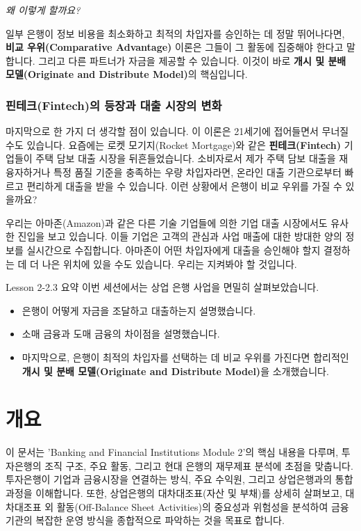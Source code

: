 \documentclass[11pt,a4paper]{article}
\theoremstyle{definition}
\begin{document}
\begin{center}
    \textit{왜 이렇게 할까요?}
\end{center}

일부 은행이 정보 비용을 최소화하고 최적의 차입자를 승인하는 데 정말 뛰어나다면, \textbf{비교 우위(Comparative Advantage)} 이론은 그들이 그 활동에 집중해야 한다고 말합니다. 그리고 다른 파트너가 자금을 제공할 수 있습니다. 이것이 바로 \textbf{개시 및 분배 모델(Originate and Distribute Model)}의 핵심입니다.

\subsubsection*{핀테크(Fintech)의 등장과 대출 시장의 변화}
마지막으로 한 가지 더 생각할 점이 있습니다. 이 이론은 21세기에 접어들면서 무너질 수도 있습니다. 요즘에는 로켓 모기지(Rocket Mortgage)와 같은 \textbf{핀테크(Fintech)} 기업들이 주택 담보 대출 시장을 뒤흔들었습니다. 소비자로서 제가 주택 담보 대출을 재융자하거나 특정 품질 기준을 충족하는 우량 차입자라면, 온라인 대출 기관으로부터 빠르고 편리하게 대출을 받을 수 있습니다. 이런 상황에서 은행이 비교 우위를 가질 수 있을까요?

우리는 아마존(Amazon)과 같은 다른 기술 기업들에 의한 기업 대출 시장에서도 유사한 진입을 보고 있습니다. 이들 기업은 고객의 관심과 사업 매출에 대한 방대한 양의 정보를 실시간으로 수집합니다. 아마존이 어떤 차입자에게 대출을 승인해야 할지 결정하는 데 더 나은 위치에 있을 수도 있습니다. 우리는 지켜봐야 할 것입니다.

\begin{summarybox}{Lesson 2-2.3 요약}
이번 세션에서는 상업 은행 사업을 면밀히 살펴보았습니다.
\begin{itemize}
    \item 은행이 어떻게 자금을 조달하고 대출하는지 설명했습니다.
    \item 소매 금융과 도매 금융의 차이점을 설명했습니다.
    \item 마지막으로, 은행이 최적의 차입자를 선택하는 데 비교 우위를 가진다면 합리적인 \textbf{개시 및 분배 모델(Originate and Distribute Model)}을 소개했습니다.
\end{itemize}
\end{summarybox}

\newpage

\newpage
\section{개요}
이 문서는 'Banking and Financial Institutions Module 2'의 핵심 내용을 다루며, 투자은행의 조직 구조, 주요 활동, 그리고 현대 은행의 재무제표 분석에 초점을 맞춥니다. 투자은행이 기업과 금융시장을 연결하는 방식, 주요 수익원, 그리고 상업은행과의 통합 과정을 이해합니다. 또한, 상업은행의 대차대조표(자산 및 부채)를 상세히 살펴보고, 대차대조표 외 활동(Off-Balance Sheet Activities)의 중요성과 위험성을 분석하여 금융기관의 복잡한 운영 방식을 종합적으로 파악하는 것을 목표로 합니다.
\end{document}
